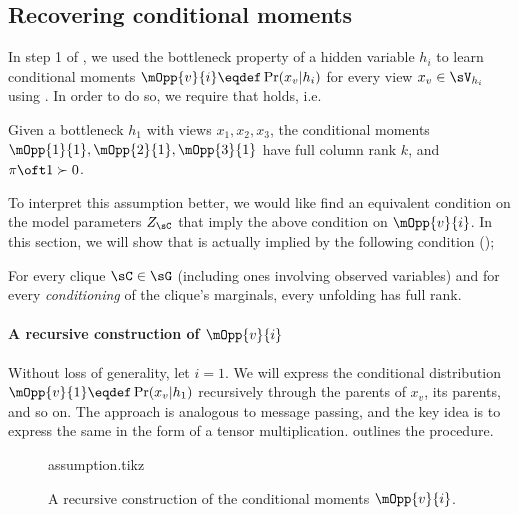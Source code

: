 \subsection{Recovering conditional moments}
\label{app:assumption-proof}

In step 1 of \LearnMarginals, we used the bottleneck property of a hidden
  variable $h_i$ to learn conditional moments $\mOpp{v}{i} \eqdef
  \Pr(x_v | h_i)$ for every view $x_v \in \sV_{h_i}$ using
  \TensorFactorize. 
In order to do so, we require that  holds, i.e.
\begin{assumption*}
  Given a bottleneck $h_1$ with views $x_1, x_2, x_3$, the conditional
  moments $\mOpp{1}{1}, \mOpp{2}{1}, \mOpp{3}{1}$ have full column rank
  $k$, and $\pi\oft 1 \succ 0$.
\end{assumption*}

To interpret this assumption better, we would like find an equivalent
condition on the model parameters $Z_\sC$ that imply the above condition
on $\mOpp{v}{i}$. In this section, we will show that
 is actually implied by the following condition
();
\begin{assumption*}
For every clique $\sC \in \sG$ (including ones involving observed
  variables) and for every {\em conditioning} of the clique's marginals,
  every unfolding has full rank. 
\end{assumption*}

\paragraph{A recursive construction of $\mOpp{v}{i}$}

Without loss of generality, let $i = 1$. We will express the conditional
distribution $\mOpp{v}{1} \eqdef \Pr(x_v | h_1)$ recursively through the
parents of $x_v$, its parents, and so on. The approach is analogous to
message passing, and the key idea is to express the same in the form of
a tensor multiplication.  outlines the
procedure.

\begin{figure}[t]
  \label{fig:message-proof}
  \centering
  {assumption.tikz}
  \caption{A recursive construction of the conditional moments $\mOpp{v}{i}$.}
\end{figure}

